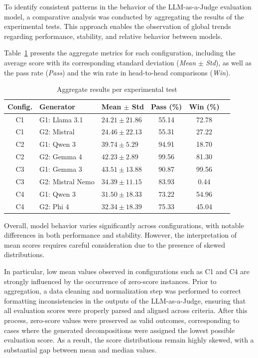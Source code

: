 \documentclass[pdflatex,sn-mathphys-num]{sn-jnl}
\theoremstyle{thmstyleone}%
\theoremstyle{thmstyletwo}%
\theoremstyle{thmstylethree}%
\begin{document}
To identify consistent patterns in the behavior of the LLM-as-a-Judge evaluation model, a comparative analysis was conducted by aggregating the results of the experimental tests. This approach enables the observation of global trends regarding performance, stability, and relative behavior between models.

Table~\ref{tab:global_results} presents the aggregate metrics for each configuration, including the average score with its corresponding standard deviation (\textit{Mean} $\pm$ \textit{Std}), as well as the pass rate (\textit{Pass}) and the win rate in head-to-head comparisons (\textit{Win}).

\begin{table}[ht]
\centering
\caption{Aggregate results per experimental test}
\label{tab:global_results}
\begin{tabular}{cllccc}
\toprule
Config. & Generator & Mean $\pm$ Std & Pass (\%) & Win (\%) \\
\midrule
C1 & G1: Llama 3.1 & $24.21 \pm 21.86$ & 55.14 & 72.78 \\
C1 & G2: Mistral & $24.46 \pm 22.13$ & 55.31 & 27.22 \\
\midrule
C2 & G1: Qwen 3 & $39.74 \pm 5.29$ & 94.91 & 18.70 \\
C2 & G2: Gemma 4 & $42.23 \pm 2.89$ & 99.56 & 81.30 \\
\midrule
C3 & G1: Gemma 3 & $43.51 \pm 13.88$ & 90.87 & 99.56 \\
C3 & G2: Mistral Nemo & $34.39 \pm 11.15$ & 83.93 & 0.44 \\
\midrule
C4 & G1: Qwen 3 & $31.50 \pm 18.33$ & 73.22 & 54.96 \\
C4 & G2: Phi 4 & $32.34 \pm 18.39$ & 75.33 & 45.04 \\
\bottomrule
\end{tabular}
\end{table}

Overall, model behavior varies significantly across configurations, with notable differences in both performance and stability. However, the interpretation of mean scores requires careful consideration due to the presence of skewed distributions.

In particular, low mean values observed in configurations such as C1 and C4 are strongly influenced by the occurrence of zero-score instances. Prior to aggregation, a data cleaning and normalization step was performed to correct formatting inconsistencies in the outputs of the LLM-as-a-Judge, ensuring that all evaluation scores were properly parsed and aligned across criteria. After this process, zero-score values were preserved as valid outcomes, corresponding to cases where the generated decompositions were assigned the lowest possible evaluation score. As a result, the score distributions remain highly skewed, with a substantial gap between mean and median values.
\end{document}
